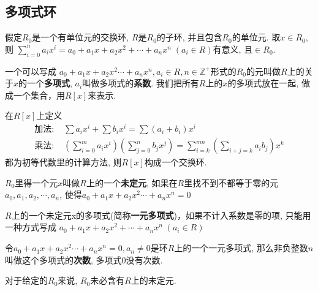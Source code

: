\subsection{多项式环} %
\begin{Note}
假定$R_0$是一个有单位元的交换环, $R$是$R_0$的子环, 并且包含$R_0$的单位元. 取$x \in R_0$, 则
$ \displaystyle \sum_{i=0}^n a_i x^i = a_0 + a_1 x + a_2 x^2 + \cdots + a_n x^n\; (a_i \in R) $有意义, 且$\in R_0$.
\end{Note}

\begin{Definition}[多项式]
一个可以写成 $ a_0 + a_1 x + a_2 x^2 \cdots + a_n x^n, a_i \in R, n \in \mathbb{Z}^+ $形式的$R_0$的元叫做$R$上的关于$x$的一个\textbf{多项式}, $a_i$叫做多项式的\textbf{系数}. 我们把所有$R$上的$x$的多项式放在一起, 做成一个集合，用$R[x]$来表示.
\end{Definition}

\begin{Note}[环上的多项式构成一个环]
在$R[x]$上定义
$$
\begin{aligned}
\text{加法: }& \displaystyle \sum a_i x^i + \sum b_i x^i = \sum (a_i + b_i) x^i \\
\text{乘法: }& \displaystyle \left(\sum_{i=0}^m a_i x^i \right) \left( \sum_{j=0}^{n} b_j x^j \right) 
= \sum_{i=k}^{mn} \left(\sum_{i+j=k} a_i b_{j} \right) x^k
\end{aligned}
$$
 都为初等代数里的计算方法, 则$R[x]$构成一个交换环.
\end{Note}

\begin{Definition}[未定元]
$R_0$里得一个元$x$叫做$R$上的一个\textbf{未定元}, 如果在$R$里找不到不都等于零的元
$a_0, a_1, a_2, \cdots, a_n$, 使得$a_0 + a_1 x + a_2 x^2 \cdots + a_n x^n = 0$
\end{Definition}

\begin{Proposition}
$R$上的一个未定元x的多项式(简称\textbf{一元多项式})，如果不计入系数是零的项, 只能用一种方式写成
$a_0 + a_1 x + a_2 x^2 + \cdots + a_n x^n \; (a_i \in R)$
\end{Proposition}

\begin{Definition}[多项式的次数]
令$a_0 + a_1 x + a_2 x^2 \cdots + a_n x^n = 0, a_n \neq \mathfrak{0}$是环$R$上的一个一元多项式,
那么非负整数$n$叫做这个多项式的\textbf{次数}, 多项式$\mathfrak{0}$没有次数.
\end{Definition}

\begin{Proposition}
对于给定的$R_0$来说, $R_0$未必含有$R$上的未定元.
\end{Proposition}


